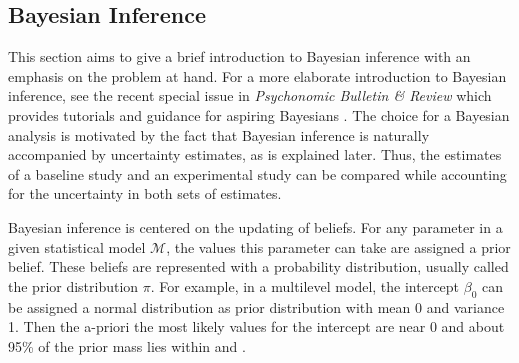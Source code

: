 \documentclass[a4paper]{article}
\newcommand{\model}{\mathcal{M}}
\begin{document}
\subsection*{Bayesian Inference}

This section aims to give a brief introduction to Bayesian inference with an emphasis on the problem at hand. For a more elaborate introduction to Bayesian inference, see the recent special issue in \emph{Psychonomic Bulletin \& Review} which provides tutorials and guidance for aspiring Bayesians \cite{VandekerckhoveEtAl2018SI}. The choice for a Bayesian analysis is motivated by the fact that Bayesian inference is naturally accompanied by uncertainty estimates, as is explained later. Thus, the estimates of a baseline study and an experimental study can be compared while accounting for the uncertainty in both sets of estimates.

Bayesian inference is centered on the updating of beliefs. For any parameter in a given statistical model $\model$, the values this parameter can take are assigned a prior belief. These beliefs are represented with a probability distribution, usually called the prior distribution $\pi$. For example, in a multilevel model, the intercept $\beta_0$ can be assigned a normal distribution as prior distribution with mean 0 and variance 1. Then the a-priori the most likely values for the intercept are near 0 and about 95\% of the prior mass lies within \pgfmathprintnumber{-\zCrit} and \pgfmathprintnumber{\zCrit}.
\end{document}
